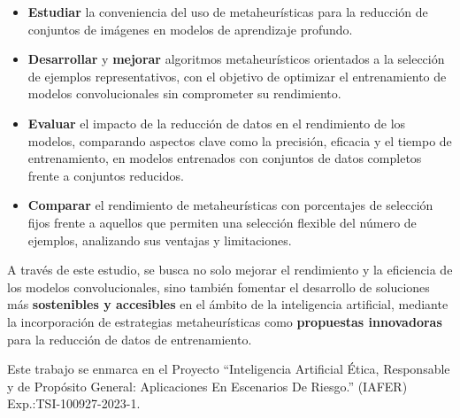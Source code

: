 \begin{itemize}
      \item \textbf{Estudiar} la conveniencia del uso de metaheurísticas para la reducción de conjuntos de imágenes
            en modelos de aprendizaje profundo.
      \item \textbf{Desarrollar} y \textbf{mejorar} algoritmos metaheurísticos orientados a la selección de ejemplos representativos,
            con el objetivo de optimizar el entrenamiento de modelos convolucionales sin comprometer su rendimiento.
      \item \textbf{Evaluar} el impacto de la reducción de datos en el rendimiento de los modelos, comparando aspectos clave
            como la precisión, eficacia y el tiempo de entrenamiento, en modelos entrenados con conjuntos de datos completos frente a conjuntos reducidos.
      \item \textbf{Comparar} el rendimiento de metaheurísticas con porcentajes de selección fijos frente a aquellos que
            permiten una selección flexible del número de ejemplos, analizando sus ventajas y limitaciones.
\end{itemize}

A través de este estudio, se busca no solo mejorar el rendimiento y la eficiencia de los modelos convolucionales,
sino también fomentar el desarrollo de soluciones más \textbf{sostenibles y accesibles} en el ámbito de la inteligencia artificial,
mediante la incorporación de estrategias metaheurísticas como \textbf{propuestas innovadoras} para la reducción de datos de entrenamiento.

Este trabajo se enmarca en el Proyecto ``Inteligencia Artificial Ética, Responsable y de Propósito General: Aplicaciones En Escenarios De Riesgo.'' (IAFER) Exp.:TSI-100927-2023-1.
